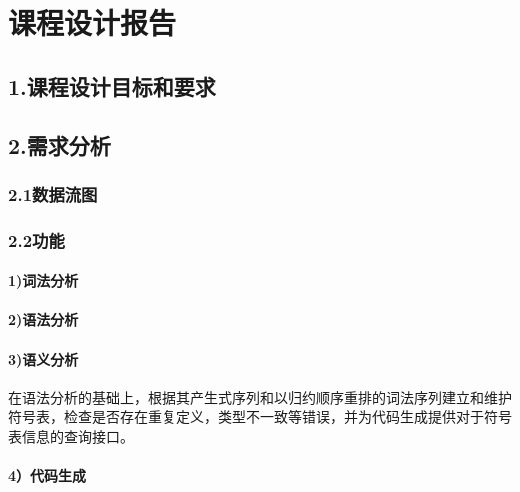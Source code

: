 \documentclass[]{ctexart}
\date{}
\let\oldparagraph\paragraph
\renewcommand{\paragraph}[1]{\oldparagraph{#1}\mbox{}}
\begin{document}
\hypertarget{header-n0}{%
\section{课程设计报告}\label{header-n0}}

\hypertarget{header-n2}{%
\subsection{1.课程设计目标和要求}\label{header-n2}}

\hypertarget{header-n3}{%
\subsection{2.需求分析}\label{header-n3}}

\hypertarget{header-n4}{%
\subsubsection{2.1数据流图}\label{header-n4}}

\hypertarget{header-n5}{%
\subsubsection{2.2功能}\label{header-n5}}

\hypertarget{header-n6}{%
\paragraph{1)词法分析}\label{header-n6}}

\hypertarget{header-n7}{%
\paragraph{2)语法分析}\label{header-n7}}

\hypertarget{header-n8}{%
\paragraph{3)语义分析}\label{header-n8}}

在语法分析的基础上，根据其产生式序列和以归约顺序重排的词法序列建立和维护符号表，检查是否存在重复定义，类型不一致等错误，并为代码生成提供对于符号表信息的查询接口。

\hypertarget{header-n10}{%
\paragraph{4）代码生成}\label{header-n10}}
\end{document}
